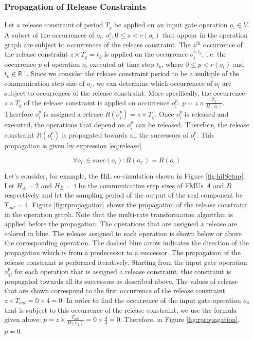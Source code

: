 \subsubsection{Propagation of Release Constraints}

Let a release constraint of period $T_y$ be applied on an input gate operation $o_i \in V$. A subset of the occurrences of $o_i$, $o^s_i, 0 \leq s < r(o_i)$ that appear in the operation graph are subject to occurrences of the release constraint. The $z^{th}$ occurrence of the release constraint $z \times T_y = t_k$ is applied on the occurrence $o^{s, t_k}_i $, i.e. the occurrence $p$ of operation $o_i$ executed at time step $t_k$, where $0 \leq p < r(o_i)$ and $t_k \in \mathbb{R}^+$. Since we consider the release constraint period to be a multiple of the communication step size of ${o_i}$, we can determine which occurrences of $o_i$ are subject to occurrences of the release constraint. More specifically, the occurrence $z \times T_y$ of the release constraint is applied on occurrence $o_i^p:\ p = z \times \frac{T_y}{H(o_i)}$. Therefore $o_i^p$ is assigned a release $R(o_i^p) = z \times T_y$. Once $o_i^p$ is released and executed, the operations that depend on $o_i^p$ can be released. Therefore, the release constraint $R(o_i^p)$ is propagated towards all the successors of $o_i^p$. This propagation is given by expression \ref{eq:release}.

\begin{equation}
\forall o_{i'} \in succ(o_i): R(o_{i'}) = R(o_i)
\label{eq:release}
\end{equation}

Let's consider, for example, the HiL co-simulation shown in Figure \ref{fig:hilSetup}. Let $H_A = 2$ and $H_B = 4$ be the communication step sizes of FMUs $A$ and $B$ respectively and let the sampling period of the output of the real component be $T_{out} = 4$. Figure \ref{fig:rpropagation} shows the propagation of the release constraint in the operation graph. Note that the multi-rate transformation algorithm is applied before the propagation. The operations that are assigned a release are colored in blue. The release assigned to each operation is shown below or above the corresponding operation. The dashed blue arrow indicates the direction of the propagation which is from a predecessor to a successor. The propagation of the release constraint is performed iteratively. Starting from the input gate operation $o_4^p$, for each operation that is assigned a release constraint, this constraint is propagated towards all its successors as described above. The values of release that are shown correspond to the first occurrence of the release constraint $z \times T_{out} = 0 \times 4 = 0$. In order to find the occurrence of the input gate operation $o_4$ that is subject to this occurrence of the release constraint, we use the formula given above: $p = z \times \frac{T_{out}}{H(o_4)} = 0 \times \frac{4}{4} = 0$. Therefore, in Figure \ref{fig:rpropagation}, $p = 0$.

